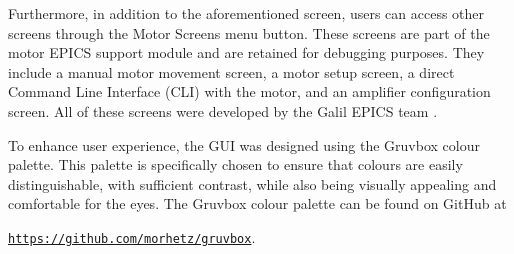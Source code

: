     Furthermore, in addition to the aforementioned screen, users can access other screens through the Motor Screens menu button.
    These screens are part of the motor EPICS support module and are retained for debugging purposes.
    They include a manual motor movement screen, a motor setup screen, a direct Command Line Interface (CLI) with the motor, and an amplifier configuration screen.
    All of these screens were developed by the Galil EPICS team \cite{farnswort2009}.

    To enhance user experience, the GUI was designed using the Gruvbox colour palette.
    This palette is specifically chosen to ensure that colours are easily distinguishable, with sufficient contrast, while also being visually appealing and comfortable for the eyes.
    The Gruvbox colour palette can be found on GitHub at

    \begin{center}
        \hyperlink{https://github.com/morhetz/gruvbox}{\texttt{https://github.com/morhetz/gruvbox}}.
    \end{center}

